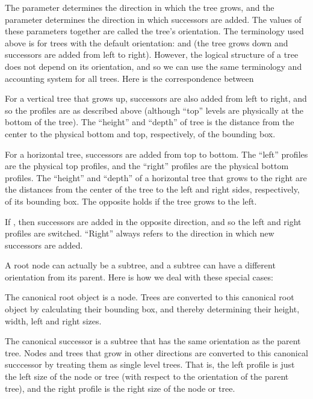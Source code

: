 \documentclass[11pt,english,BCOR10mm,DIV12,bibliography=totoc,parskip=false,smallheadings
    headexclude,footexclude,oneside]{pst-doc}
\begin{document}
The  parameter determines the direction in which the tree grows, and the  parameter determines 
the direction in which successors are added. The values of these parameters together are called the tree's 
orientation. The terminology used above is for trees with the default orientation:  and  
(the tree grows down and successors are added from left to right). 
However, the logical structure of a tree does not depend on its orientation, and so we can use the 
same terminology and accounting system for all trees. Here is the correspondence between 

\begin{compactitem}
\item For a vertical tree that grows up, successors are also added from left to right, and so the profiles 
are as described above (although ``top'' levels are physically at the bottom of the tree). The ``height'' and 
``depth'' of tree is the distance from the center to the physical bottom and top, respectively, of the bounding box.
\item For a horizontal tree, successors are added from top to bottom. The ``left'' profiles are the physical 
top profiles, and the ``right'' profiles are the physical bottom profiles. The ``height'' and ``depth'' 
of a horizontal tree that grows to the right are the distances from the center of the tree to the left 
and right sides, respectively, of its bounding box. The opposite holds if the tree grows to the left.
\item If , then successors are added in the opposite direction, and so the left and 
right profiles are switched. ``Right'' always refers to the direction in which new successors are added.
\end{compactitem}

A root node can actually be a subtree, and a subtree can have a different orientation from its parent. 
Here is how we deal with these special cases:

The canonical root object is a node. Trees are converted to this canonical root object by calculating 
their bounding box, and thereby determining their height, width, left and right sizes.

The canonical successor is a subtree that has the same orientation as the parent tree. Nodes and trees 
that grow in other directions are converted to this canonical succcessor by treating them as single level 
trees. That is, the left profile is just the left size of the node or tree (with respect to the orientation 
of the parent tree), and the right profile is the right size of the node or tree.
\end{document}
